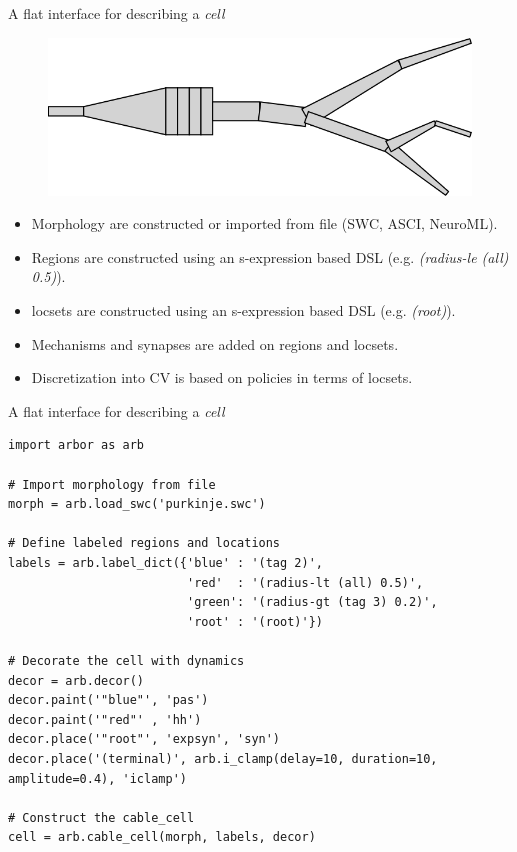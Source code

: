 \documentclass[aspectratio=43]{beamer}
\begin{document}
\begin{frame}[fragile]{A flat interface for describing a \emph{cell}}
\begin{figure}
{            }%
            {%
                \includegraphics[height=0.2\paperheight]{images/p5.png}%
            }%
    \end{figure}

    \begin{itemize}
        \item<1->Morphology are constructed or imported from file (SWC, ASCI, NeuroML).
        \item<2->Regions are constructed using an s-expression based DSL (e.g. \emph{(radius-le (all) 0.5)}).
        \item<3->locsets are constructed using an s-expression based DSL (e.g. \emph{(root)}).
        \item<4->Mechanisms and synapses are added on regions and locsets.
        \item<5->Discretization into CV is based on policies in terms of locsets.
    \end{itemize}
\end{frame}

\begin{frame}[fragile]{A flat interface for describing a \emph{cell}}
    \begin{lstlisting}[style=talkpython]
import arbor as arb

# Import morphology from file
morph = arb.load_swc('purkinje.swc')

# Define labeled regions and locations
labels = arb.label_dict({'blue' : '(tag 2)',
                         'red'  : '(radius-lt (all) 0.5)',
                         'green': '(radius-gt (tag 3) 0.2)',
                         'root' : '(root)'})

# Decorate the cell with dynamics
decor = arb.decor()
decor.paint('"blue"', 'pas')
decor.paint('"red"' , 'hh')
decor.place('"root"', 'expsyn', 'syn')
decor.place('(terminal)', arb.i_clamp(delay=10, duration=10, amplitude=0.4), 'iclamp')

# Construct the cable_cell
cell = arb.cable_cell(morph, labels, decor)
    \end{lstlisting}
\end{frame}
\end{document}

